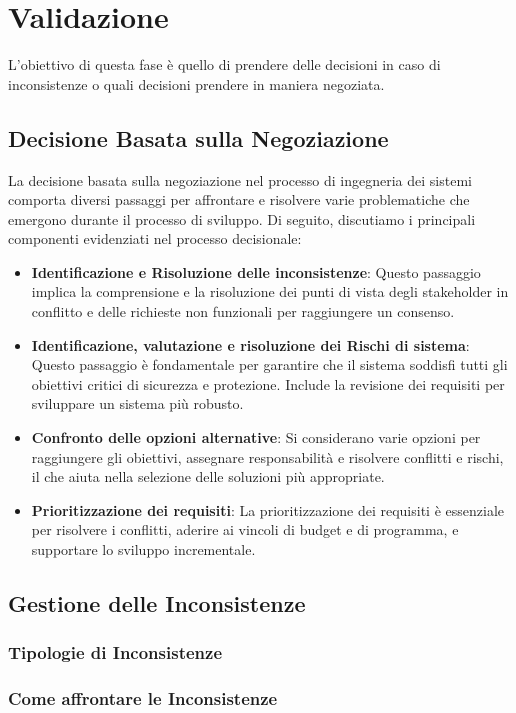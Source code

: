 \chapter{Validazione}
L'obiettivo di questa fase è quello di prendere delle decisioni in caso di inconsistenze o 
quali decisioni prendere in maniera negoziata.
\section{Decisione Basata sulla Negoziazione}

La decisione basata sulla negoziazione nel processo di ingegneria dei sistemi
comporta diversi passaggi per affrontare e risolvere varie problematiche che emergono
durante il processo di sviluppo. Di seguito, discutiamo i principali componenti
evidenziati nel processo decisionale:

\begin{itemize}
    \item \textbf{Identificazione e Risoluzione delle inconsistenze}: Questo passaggio
    implica la comprensione e la risoluzione dei punti di vista degli stakeholder in
    conflitto e delle richieste non funzionali per raggiungere un consenso.
    \item \textbf{Identificazione, valutazione e risoluzione dei Rischi di sistema}:
    Questo passaggio è fondamentale per garantire che il sistema soddisfi tutti gli
    obiettivi critici di sicurezza e protezione. Include la revisione dei requisiti
    per sviluppare un sistema più robusto.
    \item \textbf{Confronto delle opzioni alternative}: Si considerano varie opzioni
    per raggiungere gli obiettivi, assegnare responsabilità e risolvere conflitti e
    rischi, il che aiuta nella selezione delle soluzioni più appropriate.
    \item \textbf{Prioritizzazione dei requisiti}: La prioritizzazione dei requisiti
    è essenziale per risolvere i conflitti, aderire ai vincoli di budget e di programma,
    e supportare lo sviluppo incrementale.
\end{itemize}
\section{Gestione delle Inconsistenze}
\subsection{Tipologie di Inconsistenze}
\subsection{Come affrontare le Inconsistenze}
